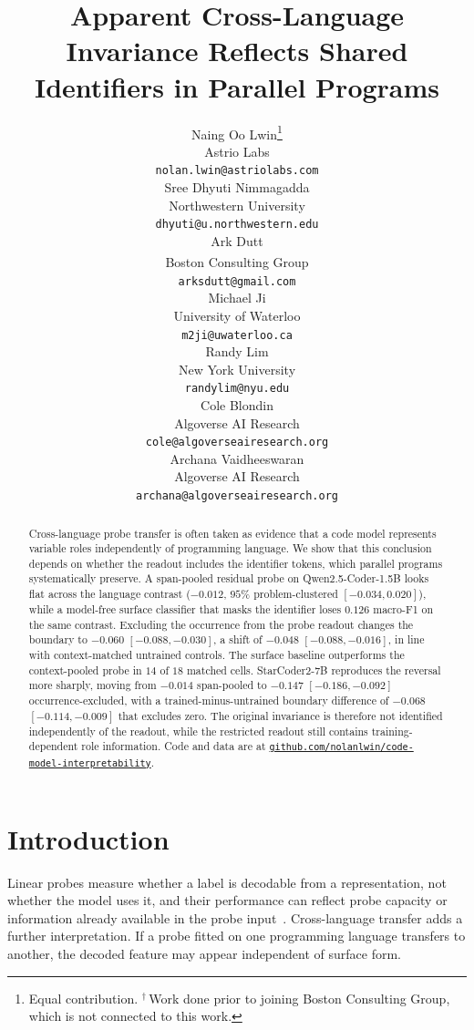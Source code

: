 \documentclass{article}
\title{Apparent Cross-Language Invariance Reflects Shared Identifiers in Parallel Programs}
\author{%
  Naing Oo Lwin\thanks{Equal contribution. $^{\dagger}$\,Work done prior to joining Boston Consulting Group, which is not connected to this work.} \\
  Astrio Labs \\
  {\small\texttt{nolan.lwin@astriolabs.com}} \\
  \And
  Sree Dhyuti Nimmagadda\footnotemark[1] \\
  Northwestern University \\
  {\small\texttt{dhyuti@u.northwestern.edu}} \\
  \And
  Ark Dutt\footnotemark[1] \\
  Boston Consulting Group\textsuperscript{\dag} \\
  {\small\texttt{arksdutt@gmail.com}} \\
  \AND
  Michael Ji\footnotemark[1] \\
  University of Waterloo \\
  {\small\texttt{m2ji@uwaterloo.ca}} \\
  \And
  Randy Lim\footnotemark[1] \\
  New York University \\
  {\small\texttt{randylim@nyu.edu}} \\
  \AND
  Cole Blondin \\
  Algoverse AI Research \\
  {\small\texttt{cole@algoverseairesearch.org}} \\
  \And
  Archana Vaidheeswaran \\
  Algoverse AI Research \\
  {\small\texttt{archana@algoverseairesearch.org}} \\
}
\begin{document}
\maketitle
\enlargethispage{\baselineskip}

\begin{abstract}
Cross-language probe transfer is often taken as evidence that a code model
represents variable roles independently of programming language. We show that
this conclusion depends on whether the readout includes the identifier tokens,
which parallel programs systematically preserve. A span-pooled residual probe
on Qwen2.5-Coder-1.5B looks flat across the language contrast
($-0.012$, $95\%$ problem-clustered $[-0.034,0.020]$), while a model-free
surface classifier that masks the identifier loses $0.126$ macro-F1 on the same
contrast. Excluding the occurrence from the probe readout changes the boundary
to $-0.060$ $[-0.088,-0.030]$, a shift of $-0.048$ $[-0.088,-0.016]$, in
line with context-matched untrained controls. The surface baseline outperforms
the context-pooled probe in $14$ of $18$ matched cells. StarCoder2-7B
reproduces the reversal more sharply, moving from $-0.014$ span-pooled to
$-0.147$ $[-0.186,-0.092]$ occurrence-excluded, with a trained-minus-untrained
boundary difference of $-0.068$ $[-0.114,-0.009]$ that excludes zero. The
original invariance is therefore not identified independently of the readout,
while the restricted readout still contains training-dependent role information.
Code and data are at
\href{https://github.com/nolanlwin/code-model-interpretability}{\nolinkurl{github.com/nolanlwin/code-model-interpretability}}.
\end{abstract}

\section{Introduction}

Linear probes measure whether a label is decodable from a representation, not
whether the model uses it, and their performance can reflect probe capacity or
information already available in the probe
input~\citep{hewitt2019control,voita2020mdl,ravichander2021probing,
elazar2021amnesic,belinkov2022probing}. Cross-language transfer adds a further
interpretation. If a probe fitted on one programming language transfers to
another, the decoded feature may appear independent of surface form.
\end{document}
